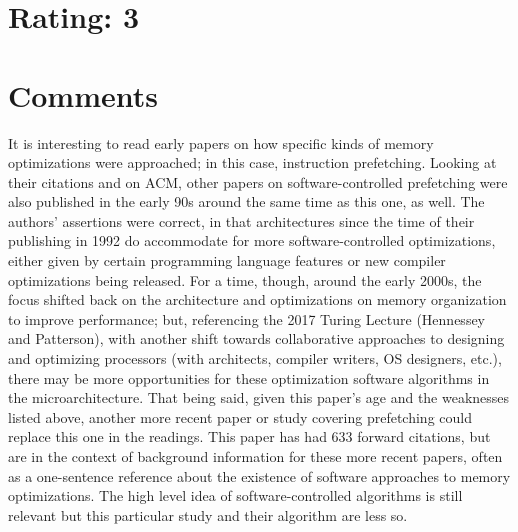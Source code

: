 \documentclass [12pt]{article}
\begin{document}
    \section{Rating: 3} %
    \label{sec:rating}

    \section{Comments} %
    \label{sec:comments}

        It is interesting to read early papers on how specific kinds of memory optimizations were approached; in this case, instruction prefetching. Looking at their citations and on ACM, other papers on software-controlled prefetching were also published in the early 90s around the same time as this one, as well. The authors' assertions were correct, in that architectures since the time of their publishing in 1992 do accommodate for more software-controlled optimizations, either given by certain programming language features or new compiler optimizations being released. For a time, though, around the early 2000s, the focus shifted back on the architecture and optimizations on memory organization to improve performance; but, referencing the 2017 Turing Lecture (Hennessey and Patterson), with another shift towards collaborative approaches to designing and optimizing processors (with architects, compiler writers, OS designers, etc.), there may be more opportunities for these optimization software algorithms in the microarchitecture. That being said, given this paper's age and the weaknesses listed above, another more recent paper or study covering prefetching could replace this one in the readings. This paper has had 633 forward citations, but are in the context of background information for these more recent papers, often as a one-sentence reference about the existence of software approaches to memory optimizations. The high level idea of software-controlled algorithms is still relevant but this particular study and their algorithm are less so. 
        
        
\end{document}
